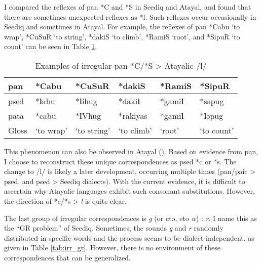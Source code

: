 I compared the reflexes of \acl{pan} *C and *S in Seediq and Atayal, and found that there are sometimes unexpected reflexes as *l. Such reflexes occur occasionally in Seediq and sometimes in Atayal. For example, the reflexes of \acl{pan} *Cabu `to wrap', *CuSuR `to string', *dakiS `to climb', *RamiS `root', and *SipuR `to count' can be seen in Table \ref{tab:panclsaic}.

\begin{table}[!htbp]
\centering
\caption{Examples of irregular \acs{pan} *C/*S > Atayalic /l/}
\label{tab:panclsaic}
\begin{tabular}{llllll}
\hline
\acs{pan}  & *Cabu     & *CuSuR      & *dakiS     & *RamiS & *SipuR    \\ \hline
\acs{psed} & *\textbf{l}abu     & *\textbf{l}ihug      & *daki\textbf{l}     & *gami\textbf{l} & *səpug    \\
\acs{pata} & *cabu     & *\textbf{l}Vhug      & *rakiyas   & *gami\textbf{l} & *\textbf{l}əpug    \\ \hline
Gloss      & `to wrap' & `to string' & `to climb' & `root' & `to count' \\ \hline
\end{tabular}
\end{table}

This phenomenon can also be observed in Atayal (\cite[173]{goderich2020phd}). Based on evidence from \acl{pan}, I choose to reconstruct these unique correspondences as \acl{psed} *c or *s. The change to /l/ is likely a later development, occurring multiple times (\acs{pan}/\acs{paic} > \acs{psed}, and \acs{psed} > Seediq dialects). With the current evidence, it is difficult to ascertain why Atayalic languages exhibit such consonant substitutions. However, the direction of *c/*s > \textit{l} is quite clear.

The last group of irregular correspondences is \textit{g} (or \ac{cto}, \ac{eto} \textit{w}) : \textit{r}. I name this as the ``GR problem'' of Seediq. Sometimes, the sounds \textit{g} and \textit{r} randomly distributed in specific words and the process seems to be dialect-independent, as given in Table \ref{tab:irr_gr}. However, there is no environment of these correspondences that can be generalized. 

